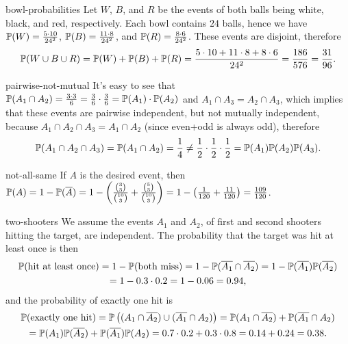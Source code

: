 \begin{sol}{bowl-probabilities}
    Let $W$, $B$, and $R$ be the events of both balls being white, black, and red, respectively. Each bowl contains $24$ balls, hence we have $\mathbb{P}(W)=\frac{5\cdot10}{24^2}$, $\mathbb{P}(B)=\frac{11\cdot8}{24^2}$, and $\mathbb{P}(R)=\frac{8\cdot6}{24^2}$. These events are disjoint, therefore
    \[
        \mathbb{P}(W\cup B\cup R)=\mathbb{P}(W)+\mathbb{P}(B)+\mathbb{P}(R)=\frac{5\cdot10+11\cdot8+8\cdot6}{24^2}=\frac{186}{576}=\frac{31}{96}.
    \]
\end{sol}

\begin{sol}{pairwise-not-mutual}
    It's easy to see that $\mathbb{P}(A_1\cap A_2) = \frac{3\cdot3}{6} = \frac36\cdot\frac36 = \mathbb{P}(A_1)\cdot\mathbb{P}(A_2)$ and $A_1\cap A_3 = A_2\cap A_3$, which implies that these events are pairwise independent, but not mutually independent, because $A_1\cap A_2\cap A_3=A_1\cap A_2$ (since even+odd is always odd), therefore
    \[
        \mathbb{P}(A_1\cap A_2\cap A_3)=\mathbb{P}(A_1\cap A_2)=\frac14\ne\frac12\cdot\frac12\cdot\frac12=\mathbb{P}(A_1)\mathbb{P}(A_2)\mathbb{P}(A_3).
    \]
\end{sol}

\begin{sol}{not-all-same}
    If $A$ is the desired event, then $\mathbb{P}(A)=1-\mathbb{P}(\overline{A})=1-\left(\frac{\binom{3}{3}}{\binom{10}{3}}+\frac{\binom{5}{3}}{\binom{10}{3}}\right)=1-\left(\frac{1}{120}+\frac{11}{120}\right)=\frac{109}{120}$.
\end{sol}

\begin{sol}{two-shooters}
    We assume the events $A_1$ and $A_2$, of first and second shooters hitting the target, are independent. The probability that the target was hit at least once is then
    \begin{multline*}
        \mathbb{P}(\text{hit at least once})=1-\mathbb{P}(\text{both miss})=1-\mathbb{P}(\overline{A_1}\cap\overline{A_2})=1-\mathbb{P}(\overline{A_1})\mathbb{P}(\overline{A_2})\\=1-0.3\cdot0.2=1-0.06=0.94,
    \end{multline*}
    and the probability of exactly one hit is
    \begin{multline*}
        \mathbb{P}(\text{exactly one hit})=\mathbb{P}\left((A_1\cap\overline{A_2})\cup(\overline{A_1}\cap A_2)\right)=\mathbb{P}(A_1\cap\overline{A_2})+\mathbb{P}(\overline{A_1}\cap A_2)\\=\mathbb{P}(A_1)\mathbb{P}(\overline{A_2})+\mathbb{P}(\overline{A_1})\mathbb{P}(A_2)=0.7\cdot0.2+0.3\cdot0.8=0.14+0.24=0.38.
    \end{multline*}
\end{sol}


